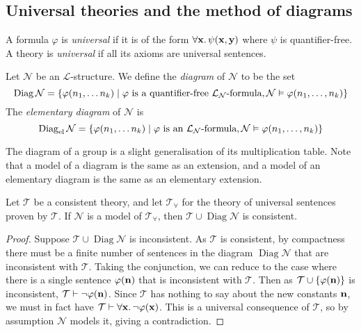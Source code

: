 \subsection{Universal theories and the method of diagrams}
\begin{definition}
    A formula \( \varphi \) is \emph{universal} if it is of the form \( \forall \vb x.\, \psi(\vb x, \vb y) \) where \( \psi \) is quantifier-free.
    A theory is \emph{universal} if all its axioms are universal sentences.
\end{definition}
\begin{definition}
    Let \( \mathcal N \) be an \( \mathcal L \)-structure.
    We define the \emph{diagram} of \( \mathcal N \) to be the set
    \[ \operatorname{Diag} \mathcal N = \qty{\varphi(n_1, \dots n_k) \mid \varphi \text{ is a quantifier-free } \mathcal L_{\mathcal N} \text{-formula}, \mathcal N \vDash \varphi(n_1, \dots, n_k)} \]
    The \emph{elementary diagram} of \( \mathcal N \) is
    \[ \operatorname{Diag}_{\text{el}} \mathcal N = \qty{\varphi(n_1, \dots n_k) \mid \varphi \text{ is an } \mathcal L_{\mathcal N} \text{-formula}, \mathcal N \vDash \varphi(n_1, \dots, n_k)} \]
\end{definition}
The diagram of a group is a slight generalisation of its multiplication table.
Note that a model of a diagram is the same as an extension, and a model of an elementary diagram is the same as an elementary extension.
\begin{lemma}
    Let \( \mathcal T \) be a consistent theory, and let \( \mathcal T_\forall \) for the theory of universal sentences proven by \( \mathcal T \).
    If \( \mathcal N \) is a model of \( \mathcal T_\forall \), then \( \mathcal T \cup \operatorname{Diag} {\mathcal N} \) is consistent.
\end{lemma}
\begin{proof}
    Suppose \( \mathcal T \cup \operatorname{Diag} {\mathcal N} \) is inconsistent.
    As \( \mathcal T \) is consistent, by compactness there must be a finite number of sentences in the diagram \( \operatorname{Diag} {\mathcal N} \) that are inconsistent with \( \mathcal T \).
    Taking the conjunction, we can reduce to the case where there is a single sentence \( \varphi(\vb n) \) that is inconsistent with \( \mathcal T \).
    Then as \( \mathcal T \cup \qty{\varphi(\vb n)} \) is inconsistent, \( \mathcal T \vdash \neg\varphi(\vb n) \).
    Since \( \mathcal T \) has nothing to say about the new constants \( \vb n \), we must in fact have \( \mathcal T \vdash \forall \vb x.\, \neg \varphi(\vb x) \).
    This is a universal consequence of \( \mathcal T \), so by assumption \( \mathcal N \) models it, giving a contradiction.
\end{proof}
